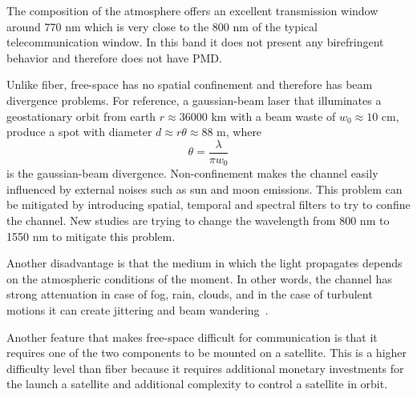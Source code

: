 The composition of the atmosphere offers an excellent transmission window around 770 nm which is very close to the 800 nm of the typical telecommunication window. In this band it does not present any birefringent behavior and therefore does not have PMD.

Unlike fiber, free-space has no spatial confinement and therefore has beam divergence problems. For reference, a gaussian-beam laser that illuminates a geostationary orbit from earth $r \approx 36000$ km with a beam waste of $w_0 \approx 10$ cm, produce a spot with diameter $d \approx r \theta \approx 88$ m, where
\begin{equation}
  \theta = \frac{\lambda}{\pi w_0}
\end{equation}
is the gaussian-beam divergence. Non-confinement makes the channel easily influenced by external noises such as sun and moon emissions. This problem can be mitigated by introducing spatial, temporal and spectral filters to try to confine the channel. New studies are trying to change the wavelength from 800 nm to 1550 nm to mitigate this problem.

Another disadvantage is that the medium in which the light propagates depends on the atmospheric conditions of the moment. In other words, the channel has strong attenuation in case of fog, rain, clouds, and in the case of turbulent motions it can create jittering and beam wandering~\cite{a25}.

Another feature that makes free-space difficult for communication is that it requires one of the two components to be mounted on a satellite. This is a higher difficulty level than fiber because it requires additional monetary investments for the launch a satellite and additional complexity to control a satellite in orbit.